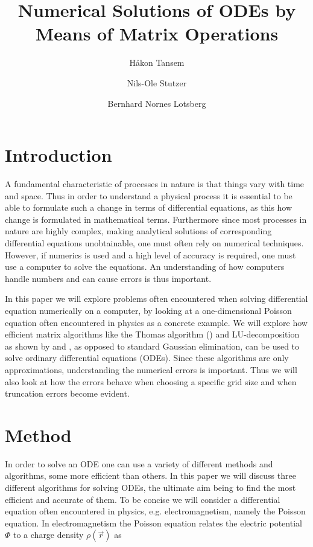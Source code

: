 \documentclass[twocolumn]{aastex62}
\begin{document}
\title{Numerical Solutions of ODEs by Means of Matrix Operations}




\author{Håkon Tansem}

\author{Nils-Ole Stutzer}

\author{Bernhard Nornes Lotsberg}

\begin{abstract}

\end{abstract}

\section{Introduction} \label{sec:intro}
A fundamental characteristic of processes in nature is that things vary with time and space. Thus in order to understand a physical process it is essential to be able to formulate such a change in terms of differential equations, as this how change is formulated in mathematical terms. Furthermore since most processes in nature are highly complex, making analytical solutions of corresponding differential equations unobtainable, one must often rely on numerical techniques. However, if numerics is used and a high level of accuracy is required, one must use a computer to solve the equations. An understanding of how computers handle numbers and can cause errors is thus important.

In this paper we will explore problems often encountered when solving differential equation numerically on a computer, by looking at a one-dimensional Poisson equation often encountered in physics as a concrete example. We will explore how efficient matrix algorithms like the Thomas algorithm (\citep[]{Jensen:2015}) and LU-decomposition as shown by \citep[p.142]{lay:2015} and \citep[p.668]{Boyd:2004}, as opposed to standard Gaussian elimination, can be used to solve ordinary differential equations (ODEs). Since these algorithms are only approximations, understanding the numerical errors is important. Thus we will also look at how the errors behave when choosing a specific grid size and when truncation errors become evident.   
 
\section{Method} \label{sec:method}
In order to solve an ODE one can use a variety of different methods and algorithms, some more efficient than others. In this paper we will discuss three different algorithms for solving ODEs, the ultimate aim being to find the most efficient and accurate of them. To be concise we will consider a differential equation often encountered in physics, e.g. electromagnetism, namely the Poisson equation. In electromagnetism the Poisson equation relates the electric potential $\Phi$ to a charge density $\rho(\vec{r})$ as 
\end{document}
